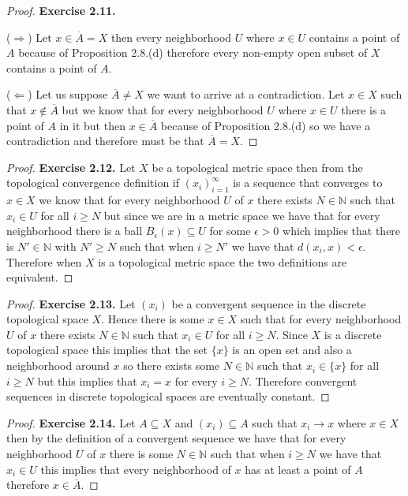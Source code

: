 \documentclass[11pt]{article}
\newcommand{\N}{\mathbb{N}}
\theoremstyle{definition}
\begin{document}
\begin{proof}{\textbf{Exercise 2.11.}}

    ($\Rightarrow$) Let $x \in \overline{A} = X$ then every neighborhood $U$
    where $x \in U$ contains a point of $A$ because of Proposition 2.8.(d)
    therefore every non-empty open subset of $X$ contains a point of $A$.

    ($\Leftarrow$) Let us suppose $\overline{A} \neq X$ we want to arrive at
    a contradiction. Let $x \in X$ such that $x \not\in \overline{A}$ but we
    know that for every neighborhood $U$ where $x \in U$ there is a point of
    $A$ in it but then $x \in \overline{A}$ because of Proposition 2.8.(d) so
    we have a contradiction and therefore must be that $\overline{A}=X$.
\end{proof}
\begin{proof}{\textbf{Exercise 2.12.}}
    Let $X$ be a topological metric space then from the topological convergence
    definition if $(x_i)_{i=1}^\infty$ is a sequence that converges to $x \in X$
    we know that for every neighborhood $U$ of $x$ there exists $N \in \N$ such
    that $x_i \in U$ for all $i \geq N$ but since we are in a metric space
    we have that for every neighborhood there is a ball
    $B_\epsilon(x) \subseteq U$ for some $\epsilon > 0$ which implies that
    there is $N' \in \N$ with $N'\geq N$ such that when $i \geq N'$ we have
    that $d(x_i, x) < \epsilon$. Therefore when $X$ is a topological metric
    space the two definitions are equivalent.
\end{proof}
\begin{proof}{\textbf{Exercise 2.13.}}
    Let $(x_i)$ be a convergent sequence in the discrete topological space $X$.
    Hence there is some $x \in X$ such that for every neighborhood $U$ of $x$
    there exists $N \in \N$ such that $x_i \in U$ for all $i \geq N$.
    Since $X$ is a discrete topological space this implies that the set $\{x\}$
    is an open set and also a neighborhood around $x$ so there exists some
    $N \in \N$ such that $x_i \in \{x\}$ for all $i \geq N$ but this implies that
    $x_i = x$ for every $i \geq N$. Therefore convergent sequences in discrete
    topological spaces are eventually constant.
\end{proof}
\cleardoublepage
\begin{proof}{\textbf{Exercise 2.14.}}
    Let $A \subseteq X$ and $(x_i) \subseteq A$ such that $x_i \to x$ where
    $x \in X$ then by the definition of a convergent sequence we have that
    for every neighborhood $U$ of $x$ there is some $N \in \N$ such that when
    $i \geq N$ we have that $x_i \in U$ this implies that every neighborhood
    of $x$ has at least a point of $A$ therefore $x \in \overline{A}$.
\end{proof}
\end{document}
